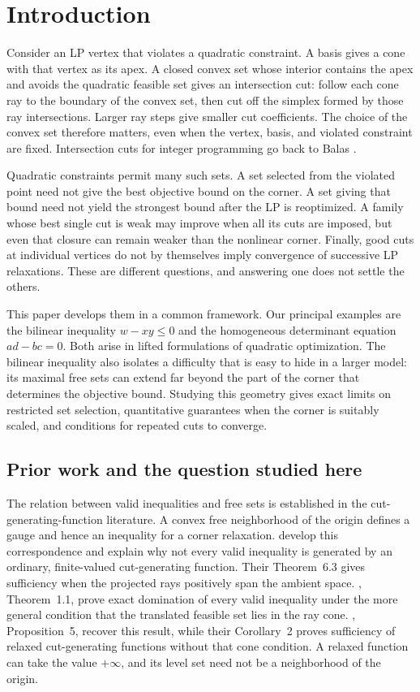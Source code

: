 \section{Introduction}\label{intro:section}

Consider an LP vertex that violates a quadratic constraint. A basis gives
a cone with that vertex as its apex. A closed convex set whose interior
contains the apex and avoids the quadratic feasible set gives an
intersection cut: follow each cone ray to the boundary of the convex set,
then cut off the simplex formed by those ray intersections. Larger ray
steps give smaller cut coefficients. The choice of the convex set
therefore matters, even when the vertex, basis, and violated constraint
are fixed. Intersection cuts for integer programming go back to Balas
\citep{Balas1971}.

Quadratic constraints permit many such sets. A set selected from the
violated point need not give the best objective bound on the corner. A
set giving that bound need not yield the strongest bound after the LP is
reoptimized. A family whose best single cut is weak may improve when all
its cuts are imposed, but even that closure can remain weaker than the
nonlinear corner. Finally, good cuts at individual vertices do not by
themselves imply convergence of successive LP relaxations. These are
different questions, and answering one does not settle the others.

This paper develops them in a common framework. Our principal examples
are the bilinear inequality $w-xy\le0$ and the homogeneous determinant
equation $ad-bc=0$. Both arise in lifted formulations of quadratic
optimization. The bilinear inequality also isolates a difficulty that is
easy to hide in a larger model: its maximal free sets can extend far
beyond the part of the corner that determines the objective bound.
Studying this geometry gives exact limits on restricted set selection,
quantitative guarantees when the corner is suitably scaled, and
conditions for repeated cuts to converge.

\subsection{Prior work and the question studied here}

The relation between valid inequalities and free sets is established in
the cut-generating-function literature. A convex free neighborhood of
the origin defines a gauge and hence an inequality for a corner
relaxation. \citet{CCDLM2015} develop this correspondence and explain why
not every valid inequality is generated by an ordinary, finite-valued
cut-generating function. Their Theorem~6.3 gives sufficiency when the
projected rays positively span the ambient space.
\citet{CWY2015}, Theorem~1.1, prove exact domination of every valid
inequality under the more general condition that the translated feasible
set lies in the ray cone. \citet{KKSteffy2016}, Proposition~5, recover
this result, while their Corollary~2 proves sufficiency of relaxed
cut-generating functions without that cone condition. A relaxed function
can take the value $+\infty$, and its level set need not be a neighborhood
of the origin.

